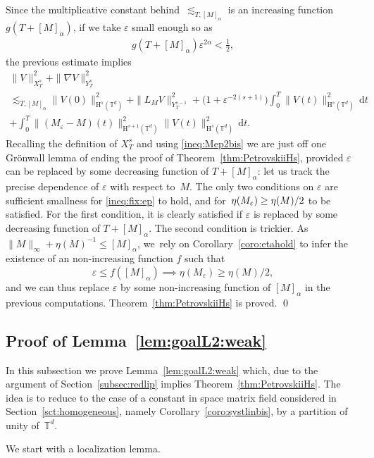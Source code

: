 \documentclass[JEP,XML,SOM,Unicode,published]{cedram}
\theoremstyle{definition}
\newcommand\T{\mathbb{T}}
\newcommand\dd{\mathrm{d}}
\renewcommand\H{\mathrm{H}}
\let\ep\varepsilon
\begin{document}
Since the multiplicative constant behind~$ \lesssim_{T,[M]_\alpha}$ is an increasing function~$ g(T+[M]_\alpha)$, if we take $\ep$ small enough so as\vspace*{-3pt}
\begin{align}\label{ineq:fix:ep}
g(T+[M]_\alpha)\ep^{2\alpha}<\frac12,
\end{align}
the previous estimate implies\vspace*{-5pt}
\begin{multline}\label{ineq:1+Mep}
\|V\|_{X_T^s}^2 + \|\nabla V\|_{Y_T^s}^2\\
\lesssim_{T,[M]_\alpha} \|V(0)\|_{\H^s(\T^d)}^2+\| L_{M}V \|_{Y_T^{s-1}}^2 + \bigl(1+ \ep^{-2(s+1)}\bigr)\int_0^T \|V(t)\|_{\H^s(\T^d)}^2\,\dd t \\
+ \int_0^T \|(M_\ep-M)(t)\|_{\H^{s+1}(\T^d)}^2\|V(t)\|_{\H^s(\T^d)}^2\,\dd t.
\end{multline}
Recalling the definition of $X_T^s$ and using \eqref{ineq:Mep2bis} we are just off one Grönwall lemma of ending the proof of Theorem~\ref{thm:PetrovskiiHs}, provided $\ep$ can be replaced by some decreasing function of $T+[M]_\alpha$: let us track the precise dependence of $\ep$ with respect to~$M$. The only two conditions on $\ep$ are sufficient smallness for \eqref{ineq:fix:ep} to hold, and for~$\eta(M_\ep)\geq\nobreak \eta(M)/2$ to be satisfied. For the first condition, it is clearly satisfied if $\ep$ is replaced by some decreasing function of $T+[M]_\alpha$. The second condition is trickier. As $\|M\|_\infty+\eta(M)^{-1}\leq [M]_\alpha$, we~rely on Corollary~\ref{coro:etahold} to infer the existence of an non-increasing function $f$ such that
\[
\ep\leq f([M]_\alpha) \implies\eta(M_\ep)\geq \eta(M)/2,
\]
and we can thus replace $\ep$ by some non-increasing function of $[M]_\alpha$ in the previous computations. Theorem~\ref{thm:PetrovskiiHs} is proved. \qed

\subsection{Proof of Lemma~\ref{lem:goalL2:weak}}\label{subsec:proof_lemma}
In this subsection we prove Lemma~\ref{lem:goalL2:weak} which, due to the argument of Section~\ref{subsec:redlip} implies Theorem~\ref{thm:PetrovskiiHs}. The idea is to reduce to the case of a constant in space matrix field considered in Section~\ref{sct:homogeneous}, namely Corollary~\ref{coro:systlinbis}, by a partition of unity of~$ \T^d$.

We start with a localization lemma.
\end{document}
